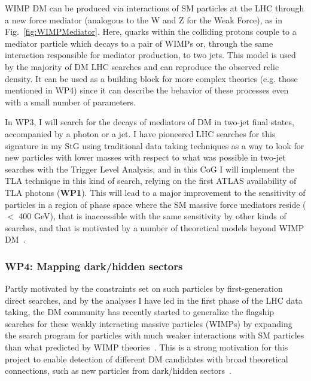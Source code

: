 \documentclass[11pt,a4paper]{article}
\begin{document}
WIMP DM can be produced via interactions of SM particles at the LHC through a new force mediator (analogous to the W and Z for the Weak Force), as in Fig.~\ref{fig:WIMPMediator}. Here, quarks within the colliding protons couple to a mediator particle which decays to a pair of WIMPs or, through the same interaction responsible for mediator production, to two jets. 
This model is used by the majority of DM LHC searches and can reproduce the observed relic density. It can be used as a building block for more complex theories (e.g. those mentioned in WP4) since it can describe the behavior of these processes even with a small number of parameters. 

In WP3, I will search for the decays of mediators of DM in two-jet final states, accompanied by a photon or a jet. I have pioneered LHC searches for this signature in my StG using traditional data taking techniques as a way to look for new particles with lower masses with respect to what was possible in two-jet searches with the Trigger Level Analysis, and in this CoG I will implement the TLA technique in this kind of search, relying on the first ATLAS availability of TLA photons (\textbf{WP1}). This will lead to a major improvement to the sensitivity of particles in a region of phase space where the SM massive force mediators reside ($<$ 400 GeV), that is inaccessible with the same sensitivity by other kinds of searches, and that is motivated by a number of theoretical models beyond WIMP DM~\cite{ALP, HooperLeane}.  

\subsubsection*{WP4: Mapping dark/hidden sectors}

Partly motivated by the constraints set on such particles by first-generation direct searches, and by the analyses I have led in the first phase of the LHC data taking, the DM community has recently started to generalize the flagship searches for these weakly interacting massive particles (WIMPs) by expanding the search program for particles with much weaker interactions with SM particles than what predicted by WIMP theories~\cite{FIMPs}. 
This is a strong motivation for this project to enable detection of different DM candidates with broad theoretical connections, such as new particles from dark/hidden sectors~\cite{HiddenSector}. 
\end{document}
